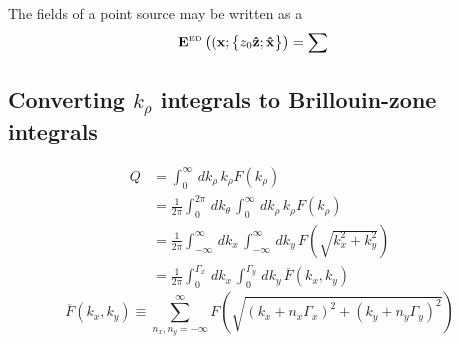 \documentclass[letterpaper]{article}
\begin{document}
The fields of a point source may be written as a
\begin{align*}
 \mathbf{E}^{\hbox{\tiny{ED}}}\left((\mathbf{x}; \big\{ z_0 \mathbf{\hat z}; \mathbf{\hat x} \big\}\right)
&= \sum
\end{align*}

\subsection*{Converting $k_\rho$ integrals to Brillouin-zone integrals}

\begin{align*}
 Q &= \int_0^\infty \, dk_\rho \, k_\rho F(k_\rho) 
\\
   &= \frac{1}{2\pi} \int_0^{2\pi} \, dk_\theta \,
                     \int_0^\infty \, dk_\rho\, k_\rho F(k_\rho)  \,
\\
   &= \frac{1}{2\pi} \int_{-\infty}^{\infty} \, dk_x \,
                     \int_{-\infty}^{\infty} \, dk_y \,
                     F\left(\sqrt{k_x^2 + k_y^2}\right)
\\
   &= \frac{1}{2\pi} \int_{0}^{\Gamma_x} \, dk_x \,
                     \int_{0}^{\Gamma_y} \, dk_y \,
                     \overline{F}(k_x, k_y)
\end{align*}
$$ \overline{F}(k_x, k_y)
   \equiv \sum_{n_x,n_y=-\infty}^\infty
          F\left(\sqrt{ (k_x + n_x\Gamma_x)^2 + (k_y + n_y\Gamma_y)^2}\right)
$$
\end{document}
